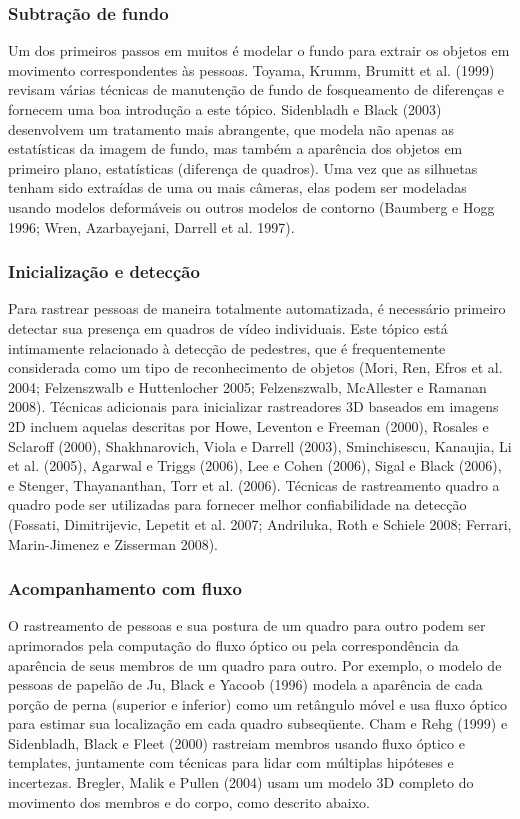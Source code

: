 \documentclass{article}
\begin{document}
\subsubsection{Subtração de fundo}
Um dos primeiros passos em muitos é modelar o fundo para extrair os objetos em movimento correspondentes às pessoas. Toyama, Krumm, Brumitt et al. (1999) revisam várias técnicas de manutenção de fundo de fosqueamento de diferenças e fornecem uma boa introdução a este tópico. Sidenbladh e Black (2003) desenvolvem um tratamento mais abrangente, que modela não apenas as estatísticas da imagem de fundo, mas também a aparência dos objetos em primeiro plano, estatísticas (diferença de quadros). Uma vez que as silhuetas tenham sido extraídas de uma ou mais câmeras, elas podem ser modeladas usando modelos deformáveis ou outros modelos de contorno (Baumberg e Hogg 1996; Wren, Azarbayejani, Darrell et al. 1997).

\subsubsection{Inicialização e detecção}
Para rastrear pessoas de maneira totalmente automatizada, é necessário primeiro detectar sua presença em quadros de vídeo individuais. Este tópico está intimamente relacionado à detecção de pedestres, que é frequentemente considerada como um tipo de reconhecimento de objetos (Mori, Ren, Efros et al. 2004; Felzenszwalb e Huttenlocher 2005; Felzenszwalb, McAllester e Ramanan 2008). Técnicas adicionais para inicializar rastreadores 3D baseados em imagens 2D incluem aquelas descritas por Howe, Leventon e Freeman (2000), Rosales e Sclaroff (2000), Shakhnarovich, Viola e Darrell (2003), Sminchisescu, Kanaujia, Li et al. (2005), Agarwal e Triggs (2006), Lee e Cohen (2006), Sigal e Black (2006), e Stenger, Thayananthan, Torr et al. (2006). Técnicas de rastreamento quadro a quadro pode ser utilizadas para fornecer melhor confiabilidade na detecção (Fossati, Dimitrijevic, Lepetit et al. 2007; Andriluka, Roth e Schiele 2008; Ferrari, Marin-Jimenez e Zisserman 2008).

\subsubsection{Acompanhamento com fluxo}
O rastreamento de pessoas e sua postura de um quadro para outro podem ser aprimorados pela computação do fluxo óptico ou pela correspondência da aparência de seus membros de um quadro para outro. Por exemplo, o modelo de pessoas de papelão de Ju, Black e Yacoob (1996) modela a aparência de cada porção de perna (superior e inferior) como um retângulo móvel e usa fluxo óptico para estimar sua localização em cada quadro subseqüente. Cham e Rehg (1999) e Sidenbladh, Black e Fleet (2000) rastreiam membros usando fluxo óptico e templates, juntamente com técnicas para lidar com múltiplas hipóteses e incertezas. Bregler, Malik e Pullen (2004) usam um modelo 3D completo do movimento dos membros e do corpo, como descrito abaixo.
\end{document}
